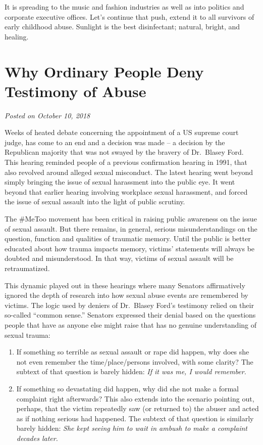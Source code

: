 \documentclass[]{book}
\begin{document}
It is spreading to the music and fashion industries as well as into politics and corporate executive offices. Let's continue that push, extend it to all survivors of early childhood abuse. Sunlight is the best disinfectant; natural, bright, and healing.

\hypertarget{why-ordinary-people-deny-testimony-of-abuse}{%
\section{Why Ordinary People Deny Testimony of Abuse}\label{why-ordinary-people-deny-testimony-of-abuse}}

\emph{Posted on October 10, 2018}

Weeks of heated debate concerning the appointment of a US supreme court judge, has come to an end and a decision was made -- a decision by the Republican majority that was not swayed by the bravery of Dr.~Blasey Ford. This hearing reminded people of a previous confirmation hearing in 1991, that also revolved around alleged sexual misconduct. The latest hearing went beyond simply bringing the issue of sexual harassment into the public eye. It went beyond that earlier hearing involving workplace sexual harassment, and forced the issue of sexual assault into the light of public scrutiny.

The \#MeToo movement has been critical in raising public awareness on the issue of sexual assault. But there remains, in general, serious misunderstandings on the question, function and qualities of traumatic memory. Until the public is better educated about how trauma impacts memory, victims' statements will always be doubted and misunderstood. In that way, victims of sexual assault will be retraumatized.

This dynamic played out in these hearings where many Senators affirmatively ignored the depth of research into how sexual abuse events are remembered by victims. The logic used by deniers of Dr.~Blasey Ford's testimony relied on their so-called ``common sense.'' Senators expressed their denial based on the questions people that have as anyone else might raise that has no genuine understanding of sexual trauma:

\begin{enumerate}
\def\labelenumi{\arabic{enumi}.}
\item
  If something so terrible as sexual assault or rape did happen, why does she not even remember the time/place/persons involved, with some clarity? The subtext of that question is barely hidden: \emph{If it was me, I would remember.}
\item
  If something so devastating did happen, why did she not make a formal complaint right afterwards? This also extends into the scenario pointing out, perhaps, that the victim repeatedly saw (or returned to) the abuser and acted as if nothing serious had happened. The subtext of that question is similarly barely hidden: \emph{She kept seeing him to wait in ambush to make a complaint decades later.}
\end{enumerate}
\end{document}

